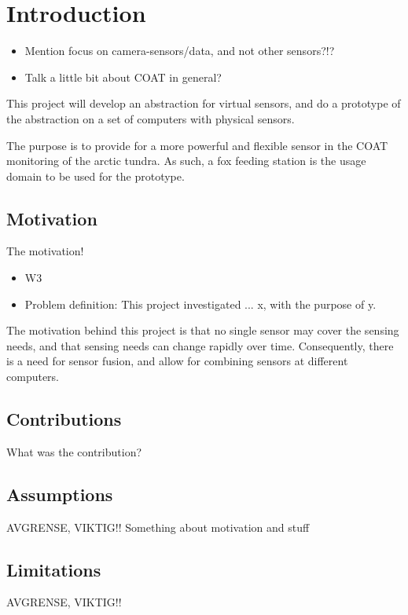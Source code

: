 \documentclass[USenglish]{uit-thesis}
\begin{document}
\tableofcontents

\listoffigures

\mainmatter

\chapter{Introduction}
\begin{itemize}
\item Mention focus on camera-sensors/data, and not other sensors?!?\cite{coursebook} 
\item Talk a little bit about COAT in general?
\end{itemize}

This project will develop an abstraction for virtual sensors, and do a prototype of the abstraction on a set of computers with physical sensors.

The purpose is to provide for a more powerful and flexible sensor in the COAT monitoring of the arctic tundra. As such, a fox feeding station is the usage domain to be used for the prototype.


\section{Motivation}
The motivation!
\begin{itemize}
\item W3
\item Problem definition: This project investigated ... x, with the purpose of y.
\end{itemize}

The motivation  behind this project is that no single sensor may cover the sensing needs, and that sensing needs can change rapidly over time. Consequently, there is a need for sensor fusion, and allow for combining sensors at different computers.

\section{Contributions}
What was the contribution?

\section{Assumptions}
AVGRENSE, VIKTIG!!
Something about motivation and stuff

\section{Limitations}
AVGRENSE, VIKTIG!!
\end{document}
